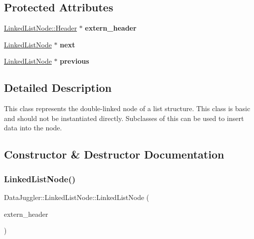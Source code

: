 \subsection*{Protected Attributes}
\begin{DoxyCompactItemize}
\item 
\mbox{\label{classDataJuggler_1_1LinkedListNode_a614e5c1d3c3fe2821eb64429e0cfbf8b}} 
\hyperlink{classDataJuggler_1_1LinkedListNode_1_1Header}{Linked\+List\+Node\+::\+Header} $\ast$ {\bfseries extern\+\_\+header}
\item 
\mbox{\label{classDataJuggler_1_1LinkedListNode_a555e08ab7b31e45dbf32e0cb5b3edfd1}} 
\hyperlink{classDataJuggler_1_1LinkedListNode}{Linked\+List\+Node} $\ast$ {\bfseries next}
\item 
\mbox{\label{classDataJuggler_1_1LinkedListNode_a60ebbf55f9b6c6bd2932c929ce7a2f26}} 
\hyperlink{classDataJuggler_1_1LinkedListNode}{Linked\+List\+Node} $\ast$ {\bfseries previous}
\end{DoxyCompactItemize}


\subsection{Detailed Description}
This class represents the double-\/linked node of a list structure. This class is basic and should not be instantiated directly. Subclasses of this can be used to insert data into the node. 

\subsection{Constructor \& Destructor Documentation}
\mbox{\label{classDataJuggler_1_1LinkedListNode_af152a8cc8a324734b8aaaf59736ccec1}} 
\subsubsection{\texorpdfstring{Linked\+List\+Node()}{LinkedListNode()}\hspace{0.1cm}{\footnotesize\ttfamily [1/2]}}
{\footnotesize\ttfamily Data\+Juggler\+::\+Linked\+List\+Node\+::\+Linked\+List\+Node (\begin{DoxyParamCaption}\item[{\hyperlink{classDataJuggler_1_1LinkedListNode_1_1Header}{Linked\+List\+Node\+::\+Header} $\ast$}]{extern\+\_\+header }\end{DoxyParamCaption})}

